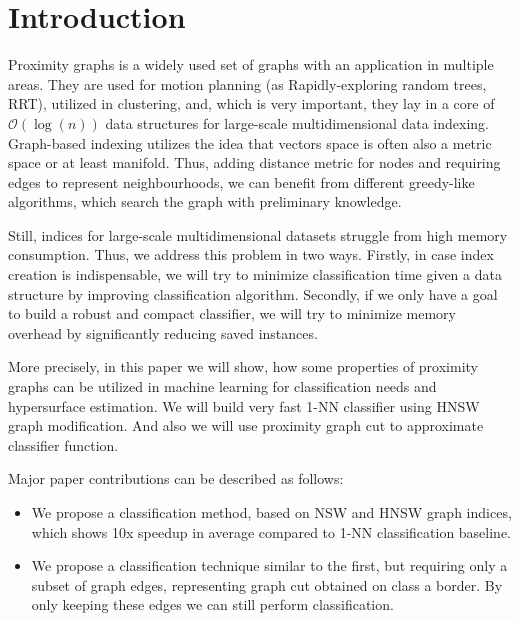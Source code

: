 \section{Introduction}\label{sec:INTRO}

Proximity graphs is a widely used set of graphs with an application in multiple areas.
They are used for motion planning (as Rapidly-exploring random trees, RRT), utilized in clustering, and, which is very important, they lay in a core of $\mathcal{O}(\log(n))$ data structures for large-scale multidimensional data indexing.
Graph-based indexing utilizes the idea that vectors space is often also a metric space or at least manifold.
Thus, adding distance metric for nodes and requiring edges to represent neighbourhoods, we can benefit from different greedy-like algorithms, which search the graph with preliminary knowledge.

Still, indices for large-scale multidimensional datasets struggle from high memory consumption. Thus, we address this problem in two ways. Firstly, in case index creation is indispensable, we will try to minimize classification time given a data structure by improving classification algorithm. Secondly, if we only have a goal to build a robust and compact classifier, we will try to minimize memory overhead by significantly reducing saved instances.

More precisely, in this paper we will show, how some properties of proximity graphs can be utilized in machine learning for classification needs and hypersurface estimation. We will build very fast 1-NN classifier using HNSW graph modification. And also we will use proximity graph cut to approximate classifier function.



Major paper contributions can be described as follows:
\begin{itemize}
    \item We propose a classification method, based on NSW and HNSW graph indices, which shows 10x speedup in average compared to 1-NN classification baseline.
    \item We propose a classification technique similar to the first, but requiring only a subset of graph edges, representing graph cut obtained on class a border. By only keeping these edges we can still perform classification.
\end{itemize}


